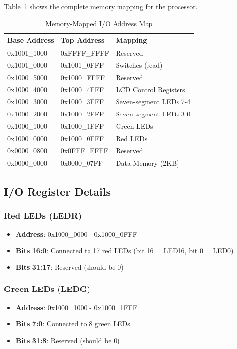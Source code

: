 Table~\ref{tab:memory_map} shows the complete memory mapping for the processor.

\begin{table}[ht]
\centering
\caption{Memory-Mapped I/O Address Map}
\label{tab:memory_map}
\begin{tabular}{lll}
\toprule
\textbf{Base Address} & \textbf{Top Address} & \textbf{Mapping} \\
\midrule
0x1001\_1000 & 0xFFFF\_FFFF & Reserved \\
0x1001\_0000 & 0x1001\_0FFF & Switches (read) \\
0x1000\_5000 & 0x1000\_FFFF & Reserved \\
0x1000\_4000 & 0x1000\_4FFF & LCD Control Registers \\
0x1000\_3000 & 0x1000\_3FFF & Seven-segment LEDs 7-4 \\
0x1000\_2000 & 0x1000\_2FFF & Seven-segment LEDs 3-0 \\
0x1000\_1000 & 0x1000\_1FFF & Green LEDs \\
0x1000\_0000 & 0x1000\_0FFF & Red LEDs \\
0x0000\_0800 & 0x0FFF\_FFFF & Reserved \\
0x0000\_0000 & 0x0000\_07FF & Data Memory (2KB) \\
\bottomrule
\end{tabular}
\end{table}

\subsection{I/O Register Details}

\subsubsection{Red LEDs (LEDR)}
\begin{itemize}
    \item \textbf{Address}: 0x1000\_0000 - 0x1000\_0FFF
    \item \textbf{Bits 16:0}: Connected to 17 red LEDs (bit 16 = LED16, bit 0 = LED0)
    \item \textbf{Bits 31:17}: Reserved (should be 0)
\end{itemize}

\subsubsection{Green LEDs (LEDG)}
\begin{itemize}
    \item \textbf{Address}: 0x1000\_1000 - 0x1000\_1FFF
    \item \textbf{Bits 7:0}: Connected to 8 green LEDs
    \item \textbf{Bits 31:8}: Reserved (should be 0)
\end{itemize}

